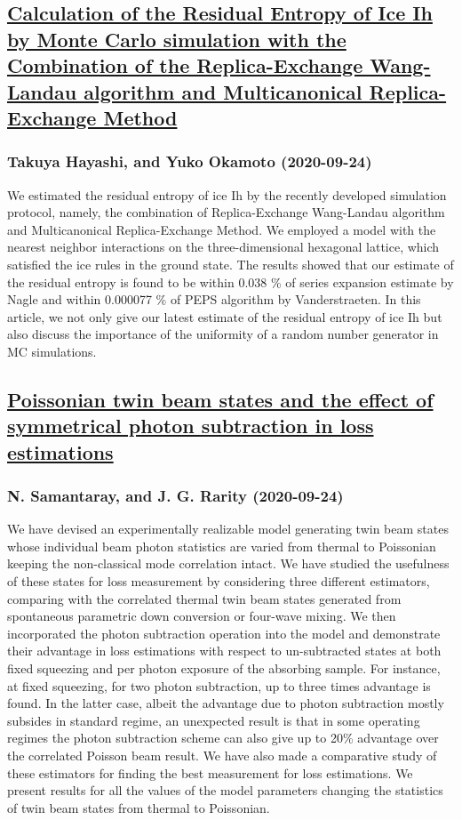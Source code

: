 \subsection*{\href{http://arxiv.org/abs/2009.11591v1}{Calculation of the Residual Entropy of Ice Ih by Monte Carlo simulation  with the Combination of the Replica-Exchange Wang-Landau algorithm and  Multicanonical Replica-Exchange Method}}
\subsubsection*{Takuya Hayashi, and Yuko Okamoto (2020-09-24)}
We estimated the residual entropy of ice Ih by the recently developed
simulation protocol, namely, the combination of Replica-Exchange Wang-Landau
algorithm and Multicanonical Replica-Exchange Method. We employed a model with
the nearest neighbor interactions on the three-dimensional hexagonal lattice,
which satisfied the ice rules in the ground state. The results showed that our
estimate of the residual entropy is found to be within 0.038 \% of series
expansion estimate by Nagle and within 0.000077 \% of PEPS algorithm by
Vanderstraeten. In this article, we not only give our latest estimate of the
residual entropy of ice Ih but also discuss the importance of the uniformity of
a random number generator in MC simulations.

\subsection*{\href{http://arxiv.org/abs/2009.11586v1}{Poissonian twin beam states and the effect of symmetrical photon  subtraction in loss estimations}}
\subsubsection*{N. Samantaray, and J. G. Rarity (2020-09-24)}
We have devised an experimentally realizable model generating twin beam
states whose individual beam photon statistics are varied from thermal to
Poissonian keeping the non-classical mode correlation intact. We have studied
the usefulness of these states for loss measurement by considering three
different estimators, comparing with the correlated thermal twin beam states
generated from spontaneous parametric down conversion or four-wave mixing. We
then incorporated the photon subtraction operation into the model and
demonstrate their advantage in loss estimations with respect to un-subtracted
states at both fixed squeezing and per photon exposure of the absorbing sample.
For instance, at fixed squeezing, for two photon subtraction, up to three times
advantage is found. In the latter case, albeit the advantage due to photon
subtraction mostly subsides in standard regime, an unexpected result is that in
some operating regimes the photon subtraction scheme can also give up to 20\%
advantage over the correlated Poisson beam result. We have also made a
comparative study of these estimators for finding the best measurement for loss
estimations. We present results for all the values of the model parameters
changing the statistics of twin beam states from thermal to Poissonian.

